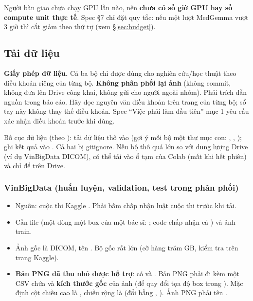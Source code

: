 \begin{unsurebox}
Người bàn giao chưa chạy GPU lần nào, nên \textbf{chưa có số giờ GPU hay số compute unit thực tế}. Spec §7 chỉ đặt quy tắc:
nếu một lượt MedGemma vượt 3 giờ thì cắt giảm theo thứ tự (xem §\ref{sec:budget}).
\end{unsurebox}

\subsection{Tải dữ liệu}
\label{sec:data}

\begin{dangerbox}
\textbf{Giấy phép dữ liệu.} Cả ba bộ chỉ được dùng cho nghiên cứu/học thuật theo điều khoản riêng của từng bộ.
\textbf{Không phân phối lại ảnh} (không commit, không đưa lên Drive công khai, không gửi cho người ngoài nhóm).
Phải trích dẫn nguồn trong báo cáo. Hãy đọc nguyên văn điều khoản trên trang của từng bộ; sổ tay này không thay thế điều khoản.
Spec ``Việc phải làm đầu tiên'' mục 1 yêu cầu xác nhận điều khoản trước khi dùng.
\end{dangerbox}

Bố cục dữ liệu (theo ): tải dữ liệu thô vào  (gợi ý mỗi bộ một thư mục con:
, , );  ghi kết quả vào .
Cả hai bị gitignore. Nếu bộ thô quá lớn so với dung lượng Drive (ví dụ VinBigData DICOM), có thể tải vào ổ tạm 
của Colab (mất khi hết phiên) và chỉ để  trên Drive.

\subsubsection{VinBigData (huấn luyện, validation, test trong phân phối)}

\begin{itemize}
\item Nguồn: cuộc thi Kaggle . Phải bấm chấp nhận luật cuộc thi  trước khi tải.
\item Cần file  (một dòng một box của một bác sĩ: ;
      code chấp nhận cả ) và ảnh train.
\item Ảnh gốc là DICOM, tên . Bộ gốc rất lớn (cỡ hàng trăm GB, kiểm tra trên trang Kaggle).
\item \textbf{Bản PNG đã thu nhỏ được hỗ trợ}:  có  và .
      Bản PNG phải đi kèm một CSV chứa  và \textbf{kích thước gốc} của ảnh (để quy đổi tọa độ box trong ).
      Mặc định cột chiều cao là , chiều rộng là  (đổi bằng , ).
      Ảnh PNG phải tên .
\end{itemize}

